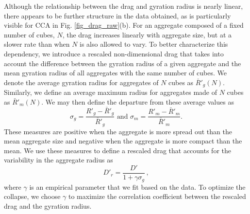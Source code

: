 Although the relationship between the drag and gyration radius is nearly linear, there appears to be further structure in the data obtained, as is particularly visible for CCA in Fig. \ref{fig_drag_raw}(b). For an aggregate composed of a fixed number of cubes, $N$, the drag increases linearly with aggregate size, but at a slower rate than when $N$ is also allowed to vary. To better characterize this dependency, we introduce a rescaled non-dimensional drag that takes into account the difference between the gyration radius of a given aggregate and the mean gyration radius of all aggregates with the same number of cubes.
We denote the average gyration radius for aggregates of $N$ cubes as $\bar{R}'_g(N)$. Similarly, 
we define an average maximum radius for aggregates made of $N$ cubes as $\bar{R}'_m(N)$. We may then define the departure from these average values as 
\[
\sigma_g = \frac{R'_g - \bar{R}'_g}{\bar{R}'_g} \text{\ \ \ \ \ \ and \ \ \ \ \ \ } \sigma_m = \frac{R'_m - \bar{R}'_m}{\bar{R}'_m}.
\]
These measures are positive when the aggregate is more spread out than the mean aggregate size and negative when the aggregate is more compact than the mean. We use these measures to define a rescaled drag that accounts for the variability in the aggregate radius as 
\begin{equation}
D'_r = \frac{D'}{1 + \gamma \sigma_g} \, , 
\label{def_drag_rescaled}
\end{equation}
where $\gamma$ is an empirical parameter that we fit based on the data. To optimize the collapse, we choose $\gamma$ to maximize the correlation coefficient between the rescaled drag and the gyration radius.  


